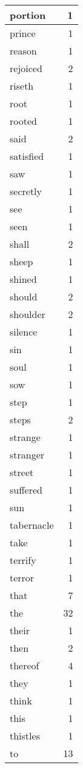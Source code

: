 \begin{center}
\begin{longtable}{l|r}
portion & 1 \\ \hline
prince & 1 \\ \hline
reason & 1 \\ \hline
rejoiced & 2 \\ \hline
riseth & 1 \\ \hline
root & 1 \\ \hline
rooted & 1 \\ \hline
said & 2 \\ \hline
satisfied & 1 \\ \hline
saw & 1 \\ \hline
secretly & 1 \\ \hline
see & 1 \\ \hline
seen & 1 \\ \hline
shall & 2 \\ \hline
sheep & 1 \\ \hline
shined & 1 \\ \hline
should & 2 \\ \hline
shoulder & 2 \\ \hline
silence & 1 \\ \hline
sin & 1 \\ \hline
soul & 1 \\ \hline
sow & 1 \\ \hline
step & 1 \\ \hline
steps & 2 \\ \hline
strange & 1 \\ \hline
stranger & 1 \\ \hline
street & 1 \\ \hline
suffered & 1 \\ \hline
sun & 1 \\ \hline
tabernacle & 1 \\ \hline
take & 1 \\ \hline
terrify & 1 \\ \hline
terror & 1 \\ \hline
that & 7 \\ \hline
the & 32 \\ \hline
their & 1 \\ \hline
then & 2 \\ \hline
thereof & 4 \\ \hline
they & 1 \\ \hline
think & 1 \\ \hline
this & 1 \\ \hline
thistles & 1 \\ \hline
to & 13 \\ \hline

\end{longtable}
\end{center}
